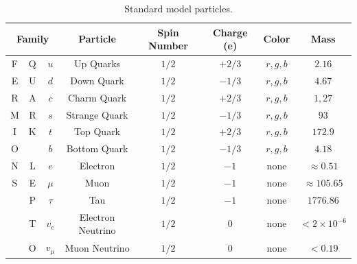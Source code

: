 

\begin{table}[h!]
  \begin{center}
    \caption{Standard model particles.}
    \label{tab:table1}
    \begin{tabular}{|c|c|c|c|c|c|c|c||} 
        \hline\hline
        \multicolumn{3}{|c|}{\textbf{Family}} & \textbf{Particle} & \textbf{Spin Number} & \textbf{Charge (e)} & \textbf{Color} & \textbf{Mass}\\
        \hline
        F & Q & $u$ & Up Quarks & $1/2$ & $+2/3$ & $r, g, b$	& $2.16$ \\
        \hline
        E & U & $d$ & Down Quark & $1/2$ & $-1/3$ & $r, g, b$ & $4.67$ \\ 
        \hline
        R & A & $c$ & Charm Quark & $1/2$ & $+2/3$ & $r, g, b$ & $1,27$ \\
        \hline
        M & R & $s$ & Strange Quark & $1/2$ & $-1/3$ & $r, g, b$ & $93$ \\
        \hline
        I & K & $t$ & Top Quark & $1/2$ & $+2/3$ & $r, g, b$ & $172.9$ \\
        \hline
        O &  & $b$ & Bottom Quark & $1/2$ & $-1/3$ & $r, g, b$ & $4.18$ \\
        \hline
        N & L & $e$ & Electron & $1/2$ & $-1$ & none & $\approx 0.51$ \\
        \hline
        S & E & $\mu$ & Muon & $1/2$ & $-1$ & none & $\approx 105.65$ \\
        \hline
          & P &  $\tau$ & Tau & $1/2$ & $-1$ & none & $1776.86$ \\
        \hline
          & T & $v_e$ & Electron Neutrino & $1/2$ & $0$ & none & $<2\times10^{-6}$ \\
        \hline
          & O & $v_\mu$ & Muon Neutrino  & $1/2$ & $0$ & none & $<0.19$ \\
        \hline

\end{tabular}
\end{center}
\end{table}
